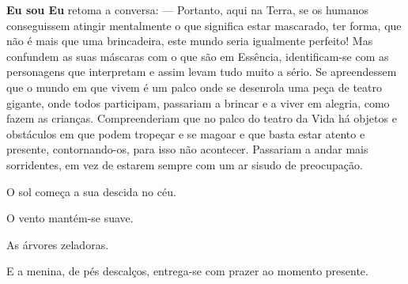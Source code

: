 \textbf{Eu sou Eu} retoma a conversa:
\bigbreak
— Portanto, aqui na Terra, se os humanos conseguissem atingir mentalmente o que significa estar mascarado, ter forma, que não é mais que uma brincadeira, este mundo seria igualmente perfeito! Mas confundem as suas máscaras com o que são em Essência, identificam-se com as personagens que interpretam e assim levam tudo muito a sério. Se apreendessem que o mundo em que vivem é um palco onde se desenrola uma peça de teatro gigante, onde todos participam, passariam a brincar e a viver em alegria, como fazem as crianças. Compreenderiam que no palco do teatro da Vida há objetos e obstáculos em que podem tropeçar e se magoar e que basta estar atento e presente, contornando-os, para isso não acontecer. Passariam a andar mais sorridentes, em vez de estarem sempre com um ar sisudo de preocupação.

O sol começa a sua descida no céu.

O vento mantém-se suave.

As árvores zeladoras.

E a menina, de pés descalços, entrega-se com prazer ao momento presente.
